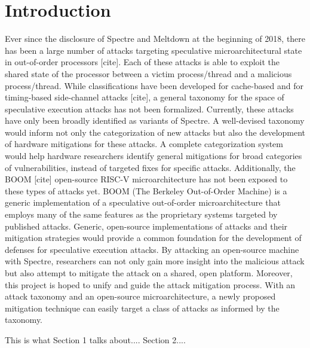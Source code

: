 \section{Introduction}

Ever since the disclosure of Spectre and Meltdown at the beginning of 2018, there has
been a large number of attacks targeting speculative microarchitectural state in
out-of-order processors [cite]. Each of these attacks is able to exploit the shared
state of the processor between a victim process/thread and a malicious process/thread.
While classifications have been developed for cache-based and for timing-based 
side-channel attacks [cite], a general taxonomy for the space of speculative execution
attacks has not been formalized. Currently, these attacks have only been broadly 
identified as variants of Spectre. A well-devised taxonomy would inform not only the 
categorization of new attacks but also the development of hardware mitigations for 
these attacks. A complete categorization system would help hardware researchers 
identify general mitigations for broad categories of vulnerabilities, instead of 
targeted fixes for specific attacks. Additionally, the BOOM [cite] open-source RISC-V
microarchitecture has not been exposed to these types of attacks yet. BOOM (The
Berkeley Out-of-Order Machine) is a generic implementation of a speculative 
out-of-order microarchitecture that employs many of the same features as the 
proprietary systems targeted by published attacks. Generic, open-source 
implementations of attacks and their mitigation strategies would provide a common 
foundation for the development of defenses for speculative execution attacks.
By attacking an open-source machine with Spectre, researchers can not only gain more 
insight into the malicious attack but also attempt to mitigate the attack on a shared,
open platform. Moreover, this project is hoped to unify and guide the attack 
mitigation process. With an attack taxonomy and an open-source microarchitecture, a 
newly proposed mitigation technique can easily target a class of attacks as informed 
by the taxonomy.

This is what Section 1 talks about.... Section 2....
